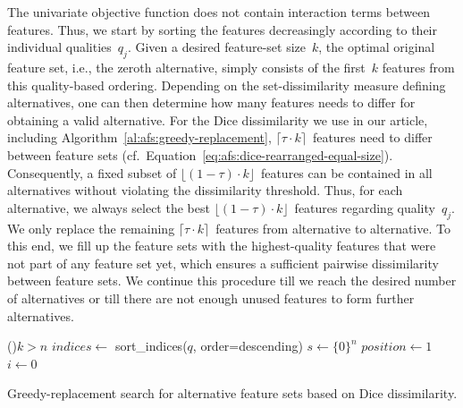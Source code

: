 \documentclass{article}
\theoremstyle{definition}
\begin{document}
The univariate objective function does not contain interaction terms between features.
Thus, we start by sorting the features decreasingly according to their individual qualities~$q_j$.
Given a desired feature-set size~$k$, the optimal original feature set, i.e., the zeroth alternative, simply consists of the first~$k$ features from this quality-based ordering.
Depending on the set-dissimilarity measure defining alternatives, one can then determine how many features needs to differ for obtaining a valid alternative.
For the Dice dissimilarity we use in our article, including Algorithm~\ref{al:afs:greedy-replacement}, $\lceil \tau \cdot k \rceil$~features need to differ between feature sets (cf.~Equation~\ref{eq:afs:dice-rearranged-equal-size}).
Consequently, a fixed subset of $\lfloor (1 - \tau) \cdot k \rfloor$~features can be contained in all alternatives without violating the dissimilarity threshold.
Thus, for each alternative, we always select the best $\lfloor (1 - \tau) \cdot k \rfloor$~features regarding quality~$q_j$.
We only replace the remaining $\lceil \tau \cdot k \rceil$~features from alternative to alternative.
To this end, we fill up the feature sets with the highest-quality features that were not part of any feature set yet, which ensures a sufficient pairwise dissimilarity between feature sets.
We continue this procedure till we reach the desired number of alternatives or till there are not enough unused features to form further alternatives.

\begin{algorithm}[htb]
	\DontPrintSemicolon
	\BlankLine
	\If(){$k > n$}{
		\Return{$\emptyset$}
	}
	$indices \leftarrow$ sort\_indices($q$, order=descending) 
	$s \leftarrow \{0\}^n$ 
	$position \leftarrow 1$ 
	$i \leftarrow 0$\ 
	\caption{Greedy-replacement search for alternative feature sets based on Dice dissimilarity.}
	\label{al:afs:greedy-replacement}
\end{algorithm}
\end{document}

